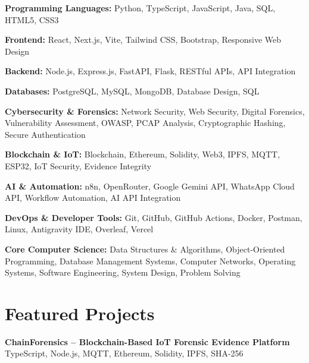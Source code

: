 \documentclass[a4paper,11pt]{article}
\newcommand{\resumeProject}[2]{
\vspace{2pt}
\textbf{#1} \hfill {\small #2}
\vspace{2pt}
}
\begin{document}
\begin{itemize}[leftmargin=0in, label={}]

\small{

\item{
\textbf{Programming Languages:} Python, TypeScript, JavaScript, Java, SQL, HTML5, CSS3
}

\item{
\textbf{Frontend:} React, Next.js, Vite, Tailwind CSS, Bootstrap, Responsive Web Design
}

\item{
\textbf{Backend:} Node.js, Express.js, FastAPI, Flask, RESTful APIs, API Integration
}

\item{
\textbf{Databases:} PostgreSQL, MySQL, MongoDB, Database Design, SQL
}

\item{
\textbf{Cybersecurity \& Forensics:} Network Security, Web Security, Digital Forensics, Vulnerability Assessment, OWASP, PCAP Analysis, Cryptographic Hashing, Secure Authentication
}

\item{
\textbf{Blockchain \& IoT:} Blockchain, Ethereum, Solidity, Web3, IPFS, MQTT, ESP32, IoT Security, Evidence Integrity
}

\item{
\textbf{AI \& Automation:} n8n, OpenRouter, Google Gemini API, WhatsApp Cloud API, Workflow Automation, AI API Integration
}

\item{
\textbf{DevOps \& Developer Tools:} Git, GitHub, GitHub Actions, Docker, Postman, Linux, Antigravity IDE, Overleaf, Vercel
}

\item{
\textbf{Core Computer Science:} Data Structures \& Algorithms, Object-Oriented Programming, Database Management Systems, Computer Networks, Operating Systems, Software Engineering, System Design, Problem Solving
}

}

\end{itemize}

\vspace{-10pt}

\section{Featured Projects}

\resumeProject
{ChainForensics -- Blockchain-Based IoT Forensic Evidence Platform}
{TypeScript, Node.js, MQTT, Ethereum, Solidity, IPFS, SHA-256}
\end{document}
